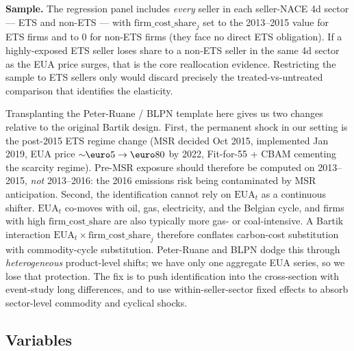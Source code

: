 \documentclass[11pt]{article}
\begin{document}
\textbf{Sample.} The regression panel includes \emph{every} seller in each seller-NACE 4d sector --- ETS and non-ETS --- with $\mathrm{firm\_cost\_share}_j$ set to the 2013--2015 value for ETS firms and to $0$ for non-ETS firms (they face no direct ETS obligation). If a highly-exposed ETS seller loses share to a non-ETS seller in the same 4d sector as the EUA price surges, that is the core reallocation evidence. Restricting the sample to ETS sellers only would discard precisely the treated-vs-untreated comparison that identifies the elasticity.

Transplanting the Peter-Ruane / BLPN template here gives us two changes relative to the original Bartik design. First, the permanent shock in our setting is the post-2015 ETS regime change (MSR decided Oct 2015, implemented Jan 2019, EUA price $\sim\!\!\mbox{\euro}5\to\mbox{\euro}80$ by 2022, Fit-for-55 + CBAM cementing the scarcity regime). Pre-MSR exposure should therefore be computed on 2013--2015, \emph{not} 2013--2016: the 2016 emissions risk being contaminated by MSR anticipation. Second, the identification cannot rely on $\mathrm{EUA}_t$ as a continuous shifter. $\mathrm{EUA}_t$ co-moves with oil, gas, electricity, and the Belgian cycle, and firms with high $\mathrm{firm\_cost\_share}$ are also typically more gas- or coal-intensive. A Bartik interaction $\mathrm{EUA}_t\times\mathrm{firm\_cost\_share}_j$ therefore conflates carbon-cost substitution with commodity-cycle substitution. Peter-Ruane and BLPN dodge this through \emph{heterogeneous} product-level shifts; we have only one aggregate EUA series, so we lose that protection. The fix is to push identification into the cross-section with event-study long differences, and to use within-seller-sector fixed effects to absorb sector-level commodity and cyclical shocks.

\subsection{Variables}
\end{document}
